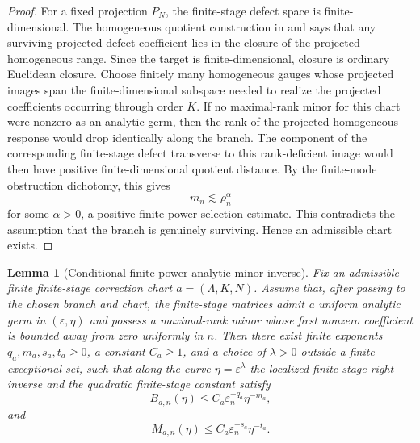 \documentclass[11pt]{article}
\numberwithin{equation}{section}
\theoremstyle{plain}
\newtheorem{lemma}{Lemma}[section]
\theoremstyle{definition}
\theoremstyle{remark}
\begin{document}
\begin{proof}
For a fixed projection \(P_N\), the finite-stage defect space is finite-dimensional.
The homogeneous quotient construction in 
and  says that any surviving projected defect
coefficient lies in the closure of the projected homogeneous range. Since the target is
finite-dimensional, closure is ordinary Euclidean closure. Choose finitely many
homogeneous gauges whose projected images span the finite-dimensional subspace needed
to realize the projected coefficients occurring through order \(K\). If no maximal-rank
minor for this chart were nonzero as an analytic germ, then the rank of the projected
homogeneous response would drop identically along the branch. The component of the
corresponding finite-stage defect transverse to this rank-deficient image would then have
positive finite-dimensional quotient distance. By the finite-mode obstruction dichotomy,
this gives
\[
        m_n\lesssim \rho_n^\alpha
\]
for some \(\alpha>0\), a positive finite-power selection estimate. This contradicts the
assumption that the branch is genuinely surviving. Hence an admissible chart exists.
\end{proof}

\begin{lemma}[Conditional finite-power analytic-minor inverse]
\label{pIV:lem:finite-power-minor-inverse}
Fix an admissible finite finite-stage correction chart \(a=(\Lambda,K,N)\).  Assume that, after passing to the chosen branch and chart, the finite-stage matrices admit a uniform analytic germ in \((\varepsilon,\eta)\) and possess a maximal-rank minor whose first nonzero coefficient is bounded away from zero uniformly in \(n\).  Then there exist finite exponents \(q_a,m_a,s_a,t_a\ge0\), a constant \(C_a\ge1\), and a choice of \(\lambda>0\) outside a finite exceptional set, such that along the curve \(\eta=\varepsilon^\lambda\) the localized finite-stage right-inverse and the quadratic finite-stage constant satisfy
\begin{equation}\label{pIV:eq:finite-power-B}
        B_{a,n}(\eta)
        \le C_a\varepsilon_n^{-q_a}\eta^{-m_a},
\end{equation}
and
\begin{equation}\label{pIV:eq:finite-power-M}
        M_{a,n}(\eta)
        \le C_a\varepsilon_n^{-s_a}\eta^{-t_a}.
\end{equation}
\end{lemma}
\end{document}

